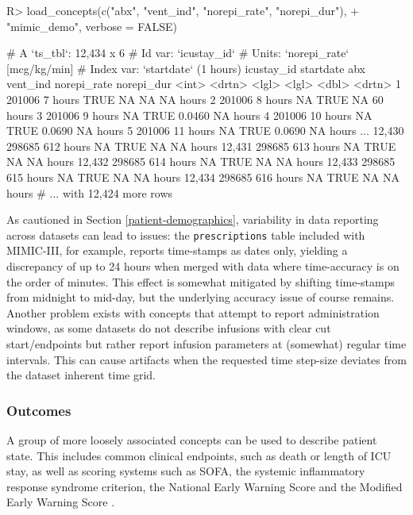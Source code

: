 \documentclass[
  notitle]{jss}
\begin{document}
\begin{CodeChunk}
\begin{CodeInput}
R> load_concepts(c("abx", "vent_ind", "norepi_rate", "norepi_dur"),
+               "mimic_demo", verbose = FALSE)
\end{CodeInput}
\begin{CodeOutput}
# A `ts_tbl`: 12,434 x 6
# Id var:     `icustay_id`
# Units:      `norepi_rate` [mcg/kg/min]
# Index var:  `startdate` (1 hours)
       icustay_id startdate abx   vent_ind norepi_rate norepi_dur
            <int> <drtn>    <lgl> <lgl>          <dbl> <drtn>
     1     201006   7 hours TRUE  NA           NA      NA hours
     2     201006   8 hours NA    TRUE         NA      60 hours
     3     201006   9 hours NA    TRUE          0.0460 NA hours
     4     201006  10 hours NA    TRUE          0.0690 NA hours
     5     201006  11 hours NA    TRUE          0.0690 NA hours
   ...
12,430     298685 612 hours NA    TRUE         NA      NA hours
12,431     298685 613 hours NA    TRUE         NA      NA hours
12,432     298685 614 hours NA    TRUE         NA      NA hours
12,433     298685 615 hours NA    TRUE         NA      NA hours
12,434     298685 616 hours NA    TRUE         NA      NA hours
# ... with 12,424 more rows
\end{CodeOutput}
\end{CodeChunk}

As cautioned in Section \ref{patient-demographics}, variability in data
reporting across datasets can lead to issues: the \texttt{prescriptions}
table included with MIMIC-III, for example, reports time-stamps as dates
only, yielding a discrepancy of up to 24 hours when merged with data
where time-accuracy is on the order of minutes. This effect is somewhat
mitigated by shifting time-stamps from midnight to mid-day, but the
underlying accuracy issue of course remains. Another problem exists with
concepts that attempt to report administration windows, as some datasets
do not describe infusions with clear cut start/endpoints but rather
report infusion parameters at (somewhat) regular time intervals. This
can cause artifacts when the requested time step-size deviates from the
dataset inherent time grid.

\hypertarget{outcomes}{%
\subsubsection{Outcomes}\label{outcomes}}

A group of more loosely associated concepts can be used to describe
patient state. This includes common clinical endpoints, such as death or
length of ICU stay, as well as scoring systems such as SOFA, the
systemic inflammatory response syndrome \citep[SIRS;][]{bone1992}
criterion, the National Early Warning Score \citep[NEWS;][]{jones2012}
and the Modified Early Warning Score \citep[MEWS;][]{subbe2001}.
\end{document}
